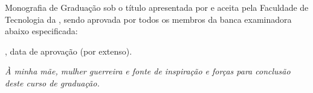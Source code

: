 \documentclass[
	12pt,			%
	openright,		%
	oneside,	
	a4paper,		%
	english,		%
	brazil			%
]{abntex2/abntex2}  %
\begin{document}
\noindent


\frenchspacing

\imprimircapa

\imprimirfolhaderosto*

%
%
% 
%
\begin{folhadeaprovacao}
	\parindent=0pt
	\setlength{\ABNTEXsignskip}{1.5cm}

	Monografia de Graduação sob o título \textit{\imprimirtitulo} apresentada por {\imprimirautor} e aceita pela Faculdade de Tecnologia da {\imprimirinstituicao}, sendo aprovada por todos os membros da banca examinadora abaixo especificada:

	\vspace{1cm}
	\vspace{1cm}
	\vfill
      
	\begin{center}
		\fontsize{12}{15}\selectfont
		\vspace*{0.5cm}
		\imprimirlocal, data de aprovação (por extenso).
		\vspace*{1cm}
	\end{center}
  
\end{folhadeaprovacao}

\begin{dedicatoria}
   \vspace*{\fill}
   \noindent
   \leftskip=7cm
   \textit{À minha mãe, mulher guerreira e fonte de inspiração e forças para conclusão deste curso de graduação.}
   \vspace{5cm}
\end{dedicatoria}
\end{document}
